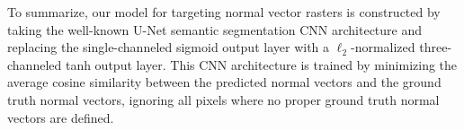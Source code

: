 To summarize, our model for targeting normal vector rasters is constructed by taking the well-known U-Net semantic segmentation CNN architecture and replacing the single-channeled sigmoid output layer with a $\ell_2$-normalized three-channeled tanh output layer.
This CNN architecture is trained by minimizing the average cosine similarity between the predicted normal vectors and the ground truth normal vectors, ignoring all pixels where no proper ground truth normal vectors are defined.
